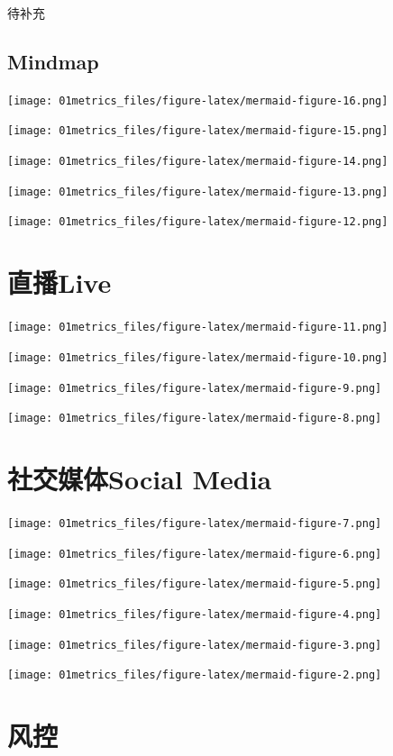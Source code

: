 \documentclass[
  letterpaper,
  DIV=11,
  numbers=noendperiod]{scrreprt}
\begin{document}
待补充

\subsection{Mindmap}\label{mindmap-1}

\texttt{[image: 01metrics\_files/figure-latex/mermaid-figure-16.png]}

\texttt{[image: 01metrics\_files/figure-latex/mermaid-figure-15.png]}

\texttt{[image: 01metrics\_files/figure-latex/mermaid-figure-14.png]}

\texttt{[image: 01metrics\_files/figure-latex/mermaid-figure-13.png]}

\texttt{[image: 01metrics\_files/figure-latex/mermaid-figure-12.png]}

\section{直播Live}\label{ux76f4ux64adlive}

\texttt{[image: 01metrics\_files/figure-latex/mermaid-figure-11.png]}

\texttt{[image: 01metrics\_files/figure-latex/mermaid-figure-10.png]}

\texttt{[image: 01metrics\_files/figure-latex/mermaid-figure-9.png]}

\texttt{[image: 01metrics\_files/figure-latex/mermaid-figure-8.png]}

\section{社交媒体Social
Media}\label{ux793eux4ea4ux5a92ux4f53social-media}

\texttt{[image: 01metrics\_files/figure-latex/mermaid-figure-7.png]}

\texttt{[image: 01metrics\_files/figure-latex/mermaid-figure-6.png]}

\texttt{[image: 01metrics\_files/figure-latex/mermaid-figure-5.png]}

\texttt{[image: 01metrics\_files/figure-latex/mermaid-figure-4.png]}

\texttt{[image: 01metrics\_files/figure-latex/mermaid-figure-3.png]}

\texttt{[image: 01metrics\_files/figure-latex/mermaid-figure-2.png]}

\section{风控}\label{ux98ceux63a7}
\end{document}
